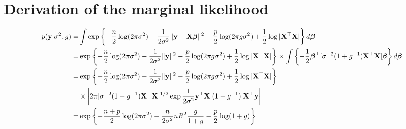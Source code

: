 \documentclass{amsart}[12pt]
\begin{document}
\section{Derivation of the marginal likelihood}
\begin{align*}
p({\bf y}|\sigma^2, g) =& \int \exp \left \{ -\frac{n}{2} \log(2 \pi \sigma^2)
                      - \frac{1}{2 \sigma^2} \|{\bf y} - {\bf X} {\boldsymbol \beta}\|^2
									    - \frac{p}{2} \log(2 \pi g \sigma^2) + \frac{1}{2} \log |{\bf X}^\top {\bf X}| \right \} d {\boldsymbol \beta} \\
=& \exp \left \{ -\frac{n}{2} \log(2 \pi \sigma^2)  - \frac{1}{2 \sigma^2} \|{\bf y}\|^2 - \frac{p}{2} \log(2 \pi g \sigma^2) + \frac{1}{2} \log |{\bf X}^\top {\bf X}| \right \}
    \times \int \left \{ -\frac{1}{2} {\boldsymbol \beta}^\top [\sigma^{-2} (1 + g^{-1}) {\bf X}^\top {\bf X}] {\boldsymbol\beta} \right \} d {\boldsymbol \beta} \\
=& \exp \left \{ -\frac{n}{2} \log(2 \pi \sigma^2)  - \frac{1}{2 \sigma^2} \|{\bf y}\|^2 - \frac{p}{2} \log(2 \pi g \sigma^2) + \frac{1}{2} \log |{\bf X}^\top {\bf X}| \right \} \\
    &\times \left |2 \pi [\sigma^{-2}(1 + g^{-1}) {\bf X}^\top {\bf X}]^{1/2}
    				\exp{\frac{1}{2 \sigma^2} {\bf y}^\top {\bf X}[(1 + g^{-1})] {\bf X}^\top {\bf y}} \right | \\
=& \exp \left \{ -\frac{n+p}{2} \log(2 \pi \sigma^2) - \frac{n}{2 \sigma^2} n R^2 \frac{g}{1 + g} - \frac{p}{2} \log(1 + g) \right \}
\end{align*}
\end{document}
